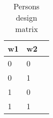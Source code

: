 \begin{table}[htbp]
\caption{\label{tab:W} Persons design matrix}\centering\medskip
\begin{tabular}{lll} \hline \hline
 \multicolumn{1}{c}{ w1 }  & w2  \\  \hline 
0 & 0 \\  
0 & 1 \\  
1 & 0 \\  
1 & 1 \\  
\hline \hline \end{tabular}
\end{table}

